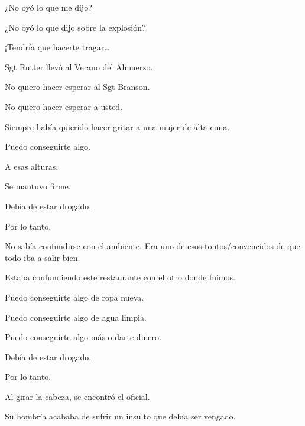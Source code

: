 \sk
¿No oyó lo que me dijo? 

\sk
¿No oyó lo que dijo sobre la explosión? 

\sk
¡Tendría que hacerte tragar\ldots{} 

\sk
Sgt Rutter llevó al Verano del Almuerzo. 

\sk
No quiero hacer esperar al Sgt Branson. 

\sk
No quiero hacer esperar a usted. \nb{}

\sk
Siempre había quierido hacer gritar a una mujer de alta cuna. 

\sk
Puedo conseguirte algo. 

\sk
A esas alturas. 

\sk
Se mantuvo firme. 

\sk
Debía de estar drogado. 

\sk
Por lo tanto. 

\sk
No sabía confundirse con el ambiente. Era uno de esos tontos/convencidos de que todo iba a salir bien. 

\sk
Estaba confundiendo este restaurante con el otro donde fuimos. 

\sk
Puedo conseguirte algo de ropa nueva. 

\sk
Puedo conseguirte algo de agua limpia. 

\sk
Puedo conseguirte algo más o darte dinero. 

\sk
Debía de estar drogado. 

\sk
Por lo tanto. 

\sk
Al girar la cabeza, se encontró el oficial. \nb{}

\sk
Su hombría acababa de sufrir un insulto que debía ser vengado. 

